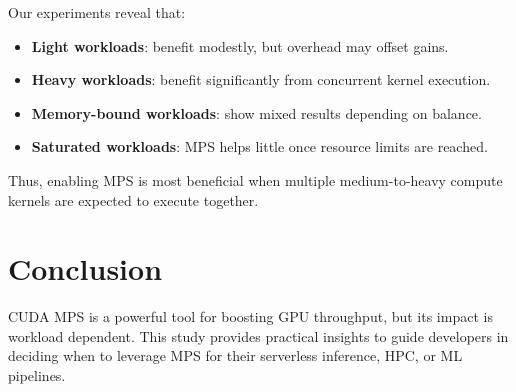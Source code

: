 \documentclass[sigconf]{acmart}
\begin{document}
Our experiments reveal that:
\begin{itemize}
    \item \textbf{Light workloads}: benefit modestly, but overhead may offset gains.
    \item \textbf{Heavy workloads}: benefit significantly from concurrent kernel execution.
    \item \textbf{Memory-bound workloads}: show mixed results depending on balance.
    \item \textbf{Saturated workloads}: MPS helps little once resource limits are reached.
\end{itemize}

Thus, enabling MPS is most beneficial when multiple medium-to-heavy compute kernels are expected to execute together.

\section{Conclusion}

CUDA MPS is a powerful tool for boosting GPU throughput, but its impact is workload dependent. This study provides practical insights to guide developers in deciding when to leverage MPS for their serverless inference, HPC, or ML pipelines.



\end{document}
